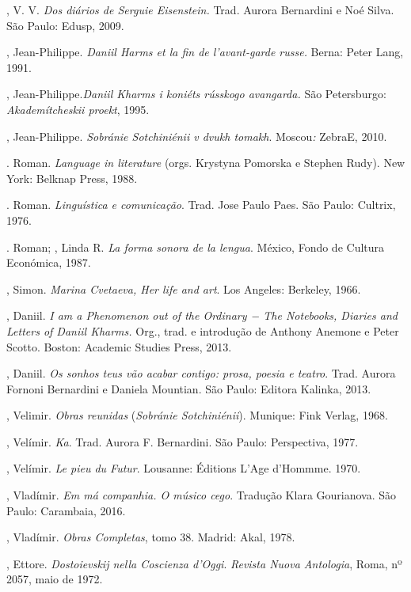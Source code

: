 \begin{Parskip}
, V. V. \emph{Dos diários de Serguie Eisenstein.} Trad. Aurora
Bernardini e Noé Silva. São Paulo: Edusp, 2009.

, Jean-Philippe. \emph{Daniil Harms et la fin de l'avant-garde
russe.} Berna: Peter Lang, 1991.

, Jean-Philippe.\emph{Daniil Kharms i koniéts rússkogo
avangarda.} São Petersburgo: \emph{Akademítcheskii proekt}, 1995.

, Jean-Philippe. \emph{Sobránie Sotchiniénii v dvukh tomakh}.
Moscou\emph{:} ZebraE, 2010.

. Roman. \emph{Language in literature} (orgs. Krystyna Pomorska
e Stephen Rudy). New York: Belknap Press, 1988.

. Roman. \emph{Linguística e comunicação}. Trad. Jose Paulo
Paes. São Paulo: Cultrix, 1976.

. Roman; , Linda R. \emph{La forma sonora de la lengua}.
México, Fondo de Cultura Económica, 1987.

, Simon. \emph{Marina Cvetaeva, Her life and art}. Los Angeles: Berkeley, 1966.

, Daniil. \emph{I am a Phenomenon out of the Ordinary − The
Notebooks, Diaries and Letters of Daniil Kharms.} Org., trad. e introdução de Anthony Anemone e Peter Scotto. Boston: Academic Studies Press, 2013.

, Daniil. \emph{Os sonhos teus vão acabar contigo: prosa, poesia e teatro}. Trad. Aurora Fornoni Bernardini e Daniela Mountian. São Paulo: Editora Kalinka, 2013.

, Velimir. \emph{Obras reunidas} (\emph{Sobránie Sotchiniénii}). Munique: Fink Verlag, 1968.

, Velímir. \emph{Ka}. Trad. Aurora F. Bernardini. São Paulo:
Perspectiva, 1977.

, Velímir. \emph{Le pieu du Futur}. Lousanne: Éditions L'Age
d'Hommme. 1970.

, Vladímir. \emph{Em má companhia. O músico cego}. Tradução Klara Gourianova. São Paulo: Carambaia, 2016.

, Vladímir. \emph{Obras Completas}, tomo 38. Madrid: Akal, 1978.

, Ettore. \emph{Dostoievskij nella Coscienza d'Oggi}. \emph{Revista Nuova Antologia}, Roma, nº 2057, maio de 1972.


\end{Parskip}
